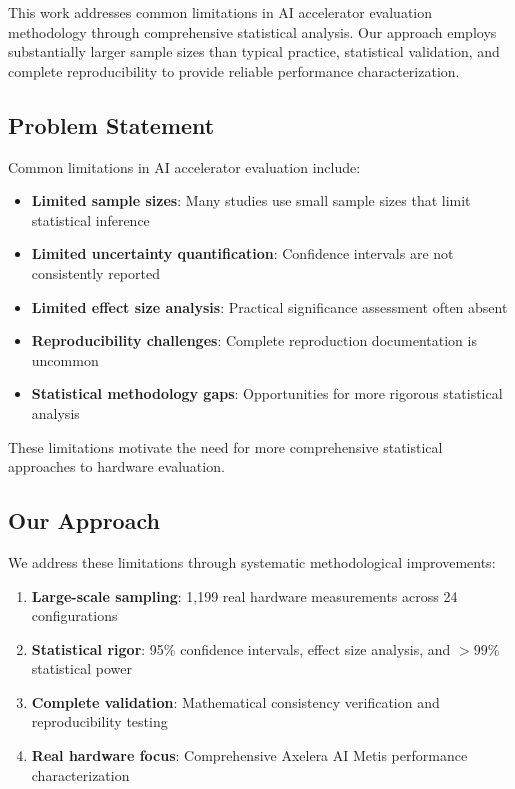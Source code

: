\documentclass[manuscript]{acmart}
\begin{document}
This work addresses common limitations in AI accelerator evaluation methodology through comprehensive statistical analysis. Our approach employs substantially larger sample sizes than typical practice, statistical validation, and complete reproducibility to provide reliable performance characterization.

\subsection{Problem Statement}

Common limitations in AI accelerator evaluation include:

\begin{itemize}
    \item \textbf{Limited sample sizes}: Many studies use small sample sizes that limit statistical inference
    \item \textbf{Limited uncertainty quantification}: Confidence intervals are not consistently reported
    \item \textbf{Limited effect size analysis}: Practical significance assessment often absent
    \item \textbf{Reproducibility challenges}: Complete reproduction documentation is uncommon
    \item \textbf{Statistical methodology gaps}: Opportunities for more rigorous statistical analysis
\end{itemize}

These limitations motivate the need for more comprehensive statistical approaches to hardware evaluation.

\subsection{Our Approach}

We address these limitations through systematic methodological improvements:

\begin{enumerate}
    \item \textbf{Large-scale sampling}: 1,199 real hardware measurements across 24 configurations
    \item \textbf{Statistical rigor}: 95\% confidence intervals, effect size analysis, and $>99\%$ statistical power
    \item \textbf{Complete validation}: Mathematical consistency verification and reproducibility testing
    \item \textbf{Real hardware focus}: Comprehensive Axelera AI Metis performance characterization
\end{enumerate}
\end{document}
